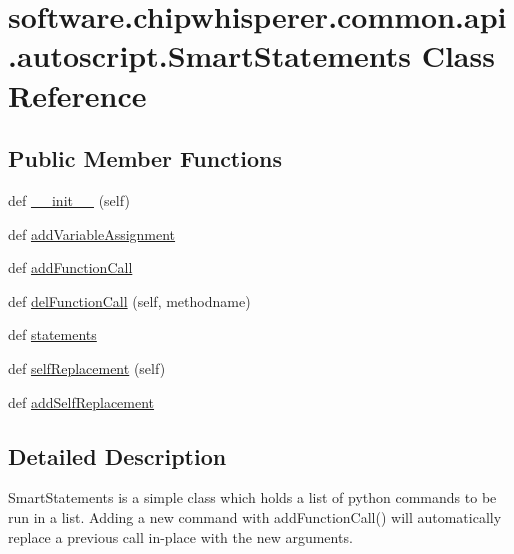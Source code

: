 \hypertarget{classsoftware_1_1chipwhisperer_1_1common_1_1api_1_1autoscript_1_1SmartStatements}{}\section{software.\+chipwhisperer.\+common.\+api.\+autoscript.\+Smart\+Statements Class Reference}
\label{classsoftware_1_1chipwhisperer_1_1common_1_1api_1_1autoscript_1_1SmartStatements}
\subsection*{Public Member Functions}
\begin{DoxyCompactItemize}
\item 
def \hyperlink{classsoftware_1_1chipwhisperer_1_1common_1_1api_1_1autoscript_1_1SmartStatements_a04fd2e08634929a891dd466867b739ad}{\+\_\+\+\_\+init\+\_\+\+\_\+} (self)
\item 
def \hyperlink{classsoftware_1_1chipwhisperer_1_1common_1_1api_1_1autoscript_1_1SmartStatements_af107c14e9e33170b981f44c5bceadcf4}{add\+Variable\+Assignment}
\item 
def \hyperlink{classsoftware_1_1chipwhisperer_1_1common_1_1api_1_1autoscript_1_1SmartStatements_aa73a99168bb14bc90ddb6101ad0809c1}{add\+Function\+Call}
\item 
def \hyperlink{classsoftware_1_1chipwhisperer_1_1common_1_1api_1_1autoscript_1_1SmartStatements_a99f6aecb789f5bb35fb8ae72d8616ef9}{del\+Function\+Call} (self, methodname)
\item 
def \hyperlink{classsoftware_1_1chipwhisperer_1_1common_1_1api_1_1autoscript_1_1SmartStatements_aaf3e2a165ea5a5e49eda591f91ef294d}{statements}
\item 
def \hyperlink{classsoftware_1_1chipwhisperer_1_1common_1_1api_1_1autoscript_1_1SmartStatements_a82f126bc016ad0c3e81e0b30ad531ef8}{self\+Replacement} (self)
\item 
def \hyperlink{classsoftware_1_1chipwhisperer_1_1common_1_1api_1_1autoscript_1_1SmartStatements_a284fddfd804bd5ea907fdbe1a11394a7}{add\+Self\+Replacement}
\end{DoxyCompactItemize}


\subsection{Detailed Description}
\begin{DoxyVerb}SmartStatements is a simple class which holds a list of python commands
to be run in a list. Adding a new command with addFunctionCall() will
automatically replace a previous call in-place with the new arguments.
\end{DoxyVerb}
 


